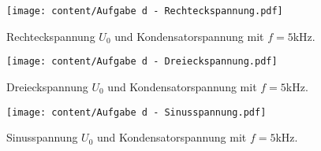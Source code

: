 \begin{figure}
  \centering
  \texttt{[image: content/Aufgabe d - Rechteckspannung.pdf]}
  \caption{Rechteckspannung $U_{0}$ und Kondensatorspannung mit $f=5$kHz.}
  \label{fig:aufgabe d - rechteckspannung}
\end{figure}

\begin{figure}
  \centering
  \texttt{[image: content/Aufgabe d - Dreieckspannung.pdf]}
  \caption{Dreieckspannung $U_{0}$ und Kondensatorspannung mit $f=5$kHz.}
  \label{fig:aufgabe d - dreieckspannung}
\end{figure}

\begin{figure}
  \centering
  \texttt{[image: content/Aufgabe d - Sinusspannung.pdf]}
  \caption{Sinusspannung $U_{0}$ und Kondensatorspannung mit $f=5$kHz.}
  \label{fig:aufgabe d - sinusspannung}
\end{figure}

